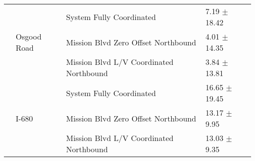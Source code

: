 \begin{tabular}{llll}
 & \multirow[t]{3}{*}{Osgood Road} & System Fully Coordinated & 7.19 $\pm$ 18.42 \\
 &  & Mission Blvd Zero Offset Northbound & 4.01 $\pm$ 14.35 \\
 &  & Mission Blvd L/V Coordinated Northbound & 3.84 $\pm$ 13.81 \\
 & \multirow[t]{3}{*}{I-680} & System Fully Coordinated & 16.65 $\pm$ 19.45 \\
 &  & Mission Blvd Zero Offset Northbound & 13.17 $\pm$ 9.95 \\
 &  & Mission Blvd L/V Coordinated Northbound & 13.03 $\pm$ 9.35 \\
\bottomrule
\end{tabular}
